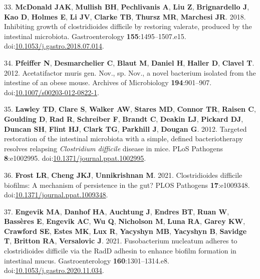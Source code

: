 \documentclass[
  11pt,
]{article}
\begin{document}
\leavevmode\hypertarget{ref-McDonald2018}{}%
33. \textbf{McDonald JAK}, \textbf{Mullish BH}, \textbf{Pechlivanis A},
\textbf{Liu Z}, \textbf{Brignardello J}, \textbf{Kao D}, \textbf{Holmes
E}, \textbf{Li JV}, \textbf{Clarke TB}, \textbf{Thursz MR},
\textbf{Marchesi JR}. 2018. Inhibiting growth of clostridioides
difficile by restoring valerate, produced by the intestinal microbiota.
Gastroenterology \textbf{155}:1495--1507.e15.
doi:\href{https://doi.org/10.1053/j.gastro.2018.07.014}{10.1053/j.gastro.2018.07.014}.

\leavevmode\hypertarget{ref-Pfeiffer2012}{}%
34. \textbf{Pfeiffer N}, \textbf{Desmarchelier C}, \textbf{Blaut M},
\textbf{Daniel H}, \textbf{Haller D}, \textbf{Clavel T}. 2012.
Acetatifactor muris gen. Nov., sp. Nov., a novel bacterium isolated from
the intestine of an obese mouse. Archives of Microbiology
\textbf{194}:901--907.
doi:\href{https://doi.org/10.1007/s00203-012-0822-1}{10.1007/s00203-012-0822-1}.

\leavevmode\hypertarget{ref-Lawley2012}{}%
35. \textbf{Lawley TD}, \textbf{Clare S}, \textbf{Walker AW},
\textbf{Stares MD}, \textbf{Connor TR}, \textbf{Raisen C},
\textbf{Goulding D}, \textbf{Rad R}, \textbf{Schreiber F},
\textbf{Brandt C}, \textbf{Deakin LJ}, \textbf{Pickard DJ},
\textbf{Duncan SH}, \textbf{Flint HJ}, \textbf{Clark TG},
\textbf{Parkhill J}, \textbf{Dougan G}. 2012. Targeted restoration of
the intestinal microbiota with a simple, defined bacteriotherapy
resolves relapsing \emph{Clostridium difficile} disease in mice. PLoS
Pathogens \textbf{8}:e1002995.
doi:\href{https://doi.org/10.1371/journal.ppat.1002995}{10.1371/journal.ppat.1002995}.

\leavevmode\hypertarget{ref-Frost2021}{}%
36. \textbf{Frost LR}, \textbf{Cheng JKJ}, \textbf{Unnikrishnan M}.
2021. Clostridioides difficile biofilms: A mechanism of persistence in
the gut? PLOS Pathogens \textbf{17}:e1009348.
doi:\href{https://doi.org/10.1371/journal.ppat.1009348}{10.1371/journal.ppat.1009348}.

\leavevmode\hypertarget{ref-Engevik2021}{}%
37. \textbf{Engevik MA}, \textbf{Danhof HA}, \textbf{Auchtung J},
\textbf{Endres BT}, \textbf{Ruan W}, \textbf{Bassères E},
\textbf{Engevik AC}, \textbf{Wu Q}, \textbf{Nicholson M}, \textbf{Luna
RA}, \textbf{Garey KW}, \textbf{Crawford SE}, \textbf{Estes MK},
\textbf{Lux R}, \textbf{Yacyshyn MB}, \textbf{Yacyshyn B},
\textbf{Savidge T}, \textbf{Britton RA}, \textbf{Versalovic J}. 2021.
Fusobacterium nucleatum adheres to clostridioides difficile via the RadD
adhesin to enhance biofilm formation in intestinal mucus.
Gastroenterology \textbf{160}:1301--1314.e8.
doi:\href{https://doi.org/10.1053/j.gastro.2020.11.034}{10.1053/j.gastro.2020.11.034}.
\end{document}
